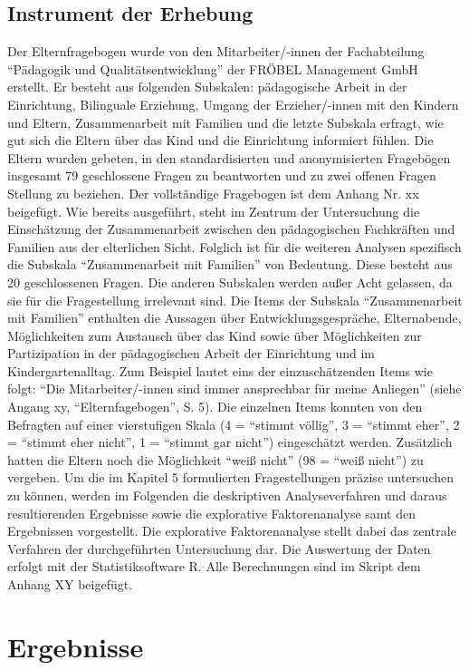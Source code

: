 \documentclass[12pt,a4paper]{article}
\begin{document}
\subsection{Instrument der Erhebung} 
Der Elternfragebogen wurde von den Mitarbeiter/-innen der Fachabteilung "`Pädagogik und Qualitätsentwicklung"' der FRÖBEL Management GmbH erstellt. Er besteht aus folgenden Subskalen: pädagogische Arbeit in der Einrichtung, Bilinguale Erziehung, Umgang der Erzieher/-innen mit den Kindern und Eltern, Zusammenarbeit mit Familien und die letzte Subskala erfragt, wie gut sich die Eltern über das Kind und die Einrichtung informiert fühlen. Die Eltern wurden gebeten, in den standardisierten und anonymisierten Fragebögen insgesamt 79 geschlossene Fragen zu beantworten und zu zwei offenen Fragen Stellung zu beziehen. Der vollständige Fragebogen ist dem Anhang Nr. xx beigefügt.
	Wie bereits ausgeführt, steht im Zentrum der Untersuchung die Einschätzung der Zusammenarbeit zwischen den pädagogischen Fachkräften und Familien aus der elterlichen Sicht. Folglich ist für die weiteren Analysen spezifisch die Subskala "`Zusammenarbeit mit Familien"' von Bedeutung. Diese besteht aus 20 geschlossenen Fragen. Die anderen Subskalen werden außer Acht gelassen, da sie für die Fragestellung irrelevant sind. 
	Die Items der Subskala "`Zusammenarbeit mit Familien"' enthalten die Aussagen über Entwicklungsgespräche, Elternabende, Möglichkeiten zum Austausch über das Kind sowie über Möglichkeiten zur Partizipation in der pädagogischen Arbeit der Einrichtung und im Kindergartenalltag. Zum Beispiel lautet eins der einzuschätzenden Items wie folgt: "`Die Mitarbeiter/-innen sind immer ansprechbar für meine Anliegen"' (siehe Angang xy, "`Elternfagebogen"', S. 5).
	Die einzelnen Items konnten von den Befragten auf einer vierstufigen Skala (4 = "`stimmt völlig"', 3 = "`stimmt eher"', 2 = "`stimmt eher nicht"', 1 = "`stimmt gar nicht"') eingeschätzt werden. Zusätzlich hatten die Eltern noch die Möglichkeit "`weiß nicht"' (98 = "`weiß nicht"') zu vergeben.   
	Um die im Kapitel 5 formulierten Fragestellungen präzise untersuchen zu können, werden im Folgenden die deskriptiven Analyseverfahren und daraus resultierenden Ergebnisse sowie die explorative Faktorenanalyse samt den Ergebnissen vorgestellt. Die explorative Faktorenanalyse stellt dabei das zentrale Verfahren der durchgeführten Untersuchung dar. Die Auswertung der Daten erfolgt mit der Statistiksoftware R. Alle Berechnungen sind im Skript dem Anhang XY beigefügt.

\section{Ergebnisse}  
\end{document}

